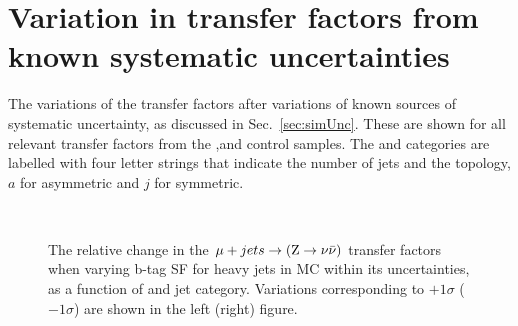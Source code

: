 \clearpage
\section{Variation in transfer factors from known systematic
uncertainties}
\label{app:tfSysts}

The variations of the transfer factors after variations of known
sources of systematic uncertainty, as discussed in
Sec.~\ref{sec:simUnc}. These are shown for all relevant transfer
factors from the \gj,\mj and \mmj control samples. The \nj and \nb
categories are labelled with four letter strings that indicate the
number of jets and the topology, $a$ for asymmetric and $j$ for
symmetric.

\begin{figure}[!h]
  \centering
   ~~
  \\

  \caption{\label{fig:tfSyst_bsf_muToZinv} The relative change in the
  $\mu + jets \rightarrow ({\text Z} \rightarrow \nu\bar{\nu})$ transfer
  factors when varying b-tag SF for heavy jets in MC within its uncertainties, as a function of \scalht and jet category. 
  Variations corresponding to $+1\sigma$ ($-1\sigma$) are shown in the left (right) figure. 
  }
\end{figure}

